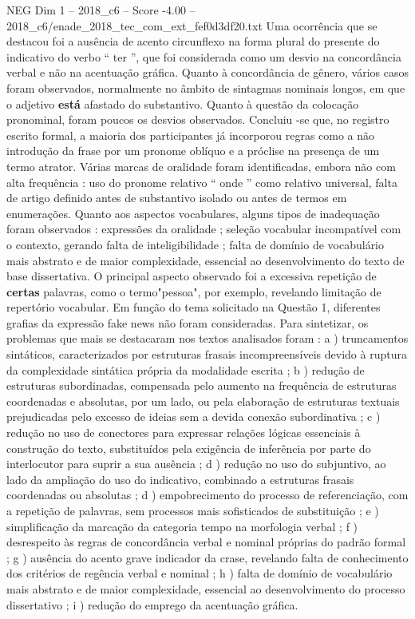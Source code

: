 \begin{textsample}{NEG Dim 1 – 2018\_c6 – Score -4.00 – 2018\_c6/enade\_2018\_tec\_com\_ext\_fef0d3df20.txt}
Uma ocorrência que se destacou foi a ausência de acento circunflexo na forma plural do presente do indicativo do verbo “ ter ”, que foi considerada como um desvio na concordância verbal e não na acentuação gráfica.
Quanto à concordância de gênero, vários casos foram observados, normalmente no âmbito de sintagmas nominais longos, em que o adjetivo \textbf{está} afastado do substantivo.
Quanto à questão da colocação pronominal, foram poucos os desvios observados.
Concluiu -se que, no registro escrito formal, a maioria dos participantes já incorporou regras como a não introdução da frase por um pronome oblíquo e a próclise na presença de um termo atrator.
Várias marcas de oralidade foram identificadas, embora não com alta frequência : uso do pronome relativo “ onde ” como relativo universal, falta de artigo definido antes de substantivo isolado ou antes de termos em enumerações.
Quanto aos aspectos vocabulares, alguns tipos de inadequação foram observados : expressões da oralidade ; seleção vocabular incompatível com o contexto, gerando falta de inteligibilidade ; falta de domínio de vocabulário mais abstrato e de maior complexidade, essencial ao desenvolvimento do texto de base dissertativa.
O principal aspecto observado foi a excessiva repetição de \textbf{certas} palavras, como o termo"pessoa", por exemplo, revelando limitação de repertório vocabular.
Em função do tema solicitado na Questão 1, diferentes grafias da expressão fake news não foram consideradas.
Para sintetizar, os problemas que mais se destacaram nos textos analisados foram : a ) truncamentos sintáticos, caracterizados por estruturas frasais incompreensíveis devido à ruptura da complexidade sintática própria da modalidade escrita ; b ) redução de estruturas subordinadas, compensada pelo aumento na frequência de estruturas coordenadas e absolutas, por um lado, ou pela elaboração de estruturas textuais prejudicadas pelo excesso de ideias sem a devida conexão subordinativa ; c ) redução no uso de conectores para expressar relações lógicas essenciais à construção do texto, substituídos pela exigência de inferência por parte do interlocutor para suprir a sua ausência ; d ) redução no uso do subjuntivo, ao lado da ampliação do uso do indicativo, combinado a estruturas frasais coordenadas ou absolutas ; d ) empobrecimento do processo de referenciação, com a repetição de palavras, sem processos mais sofisticados de substituição ; e ) simplificação da marcação da categoria tempo na morfologia verbal ; f ) desrespeito às regras de concordância verbal e nominal próprias do padrão formal ; g ) ausência do acento grave indicador da crase, revelando falta de conhecimento dos critérios de regência verbal e nominal ; h ) falta de domínio de vocabulário mais abstrato e de maior complexidade, essencial ao desenvolvimento do processo dissertativo ; i ) redução do emprego da acentuação gráfica.

\end{textsample}
